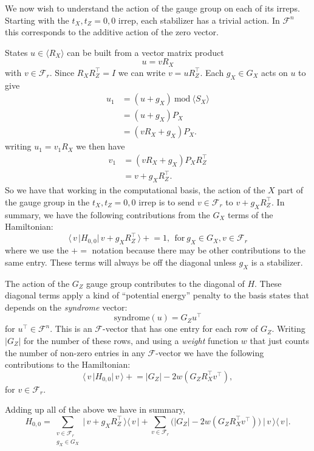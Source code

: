 \documentclass[a4paper,onecolumn,11pt,unpublished]{quantumarticle}
\newcommand{\todo}[1]{\ \textcolor{red}{\{#1\}}\ }
\newcommand{\bket}[1]{\bigl|\,{#1}\,\bigr\rangle}
\newcommand{\bbra}[1]{\bigl\langle\,{#1}\,\bigr|}
\def\Span#1{\langle #1 \rangle}
\newcommand{\Field}{\mathcal{F}}
\def\Fn{\Field^n}
\def\Frd{\Field_{r}}
\begin{document}
We now wish to understand the action of the
gauge group on each of its irreps.
Starting with the $t_X,t_Z=0,0$ irrep, each stabilizer has a trivial action. 
In $\Fn$ this
corresponds to the additive action of the zero vector.

\newcommand{\pluseq}{\mathrel{+}=}
States $u\in\Span{R_X}$ can be built from a
vector matrix product
$$
    u = v R_X
$$
with $v\in\Frd.$
Since $R_X R_Z^\top = I$
we can write $v = u R_Z^\top.$
Each $g_X\in G_X$ acts on $u$ to give
\begin{align*}
    u_1 &= (u + g_X) \ \mbox{mod}\ \Span{S_X} \\
        &= (u + g_X) P_X \\
        &= (v R_X + g_X) P_X.
\end{align*}
writing $u_1 = v_1 R_X$ we then have
\begin{align*}
    v_1 &= (v R_X + g_X) P_X R_Z^\top \\
        &= v + g_X R_Z^\top.
\end{align*}
So we have that working in the computational
basis, the action of the $X$ part of the
gauge group in the $t_X,t_Z=0,0$ irrep is to send
$v\in \Frd$ to $v + g_X R_Z^\top.$
In summary, we have the following contributions from the
$G_X$ terms of the Hamiltonian:
$$
    \bbra{v} H_{0,0} \bket{v+g_X  R_Z^\top} 
        \pluseq 1,\ \ \mbox{for}\ g_X\in G_X, v\in \Frd
$$
where we use the $\pluseq$ notation
because there may be other contributions to the
same entry.
These terms will always be off
the diagonal unless $g_X$ is a stabilizer.

The action of the $G_Z$ gauge group
contributes to the diagonal of $H.$
These diagonal terms apply a kind of
``potential energy'' penalty
to the basis states
that depends on the \emph{syndrome} vector:
$$
    \mbox{syndrome}(u) = G_Z u^\top
$$
for $u^\top \in \Fn.$
This is an $\Field$-vector that has one entry for
each row of $G_Z.$
Writing $|G_Z|$ for the number of these rows, and 
using a \emph{weight} function $w$ that just counts
the number of non-zero entries in any $\Field$-vector
we have the following contributions to
the Hamiltonian:
$$
    \bbra{v} H_{0,0} \bket{v} 
        \pluseq |G_Z| - 2w(G_Z R_X^\top v^\top),
$$
for $v\in \Frd.$

Adding up all of the above we
have in summary,
\begin{equation}\label{hamblockgs}
H_{0,0} = \sum_{\substack{v\in\Frd\\g_X\in G_X } }
  \bket{v+g_X  R_Z^\top}\bbra{v} 
  + \sum_{v\in\Frd} \bigl(|G_Z| - 2w(G_Z R_X^\top v^\top)
    \bigr) \ \bket{v}\bbra{v}.
\end{equation}
\end{document}
